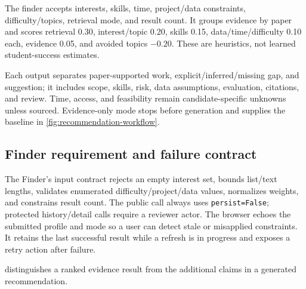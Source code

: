 The finder accepts interests, skills, time, project/data constraints, difficulty/topics, retrieval mode, and result count. It groups evidence by paper and scores retrieval 0.30, interest/topic 0.20, skills 0.15, data/time/difficulty 0.10 each, evidence 0.05, and avoided topics $-0.20$. These are heuristics, not learned student-success estimates.

Each output separates paper-supported work, explicit/inferred/missing gap, and suggestion; it includes scope, skills, risk, data assumptions, evaluation, citations, and review. Time, access, and feasibility remain candidate-specific unknowns unless sourced. Evidence-only mode stops before generation and supplies the baseline in \cref{fig:recommendation-workflow}.

\subsection{Finder requirement and failure contract}

The Finder's input contract rejects an empty interest set, bounds list/text lengths, validates enumerated difficulty/project/data values, normalizes weights, and constrains result count. The public  call always uses \texttt{persist=False}; protected history/detail calls require a reviewer actor. The browser echoes the submitted profile and mode so a user can detect stale or misapplied constraints. It retains the last successful result while a refresh is in progress and exposes a retry action after failure.

 distinguishes a ranked evidence result from the additional claims in a generated recommendation.

